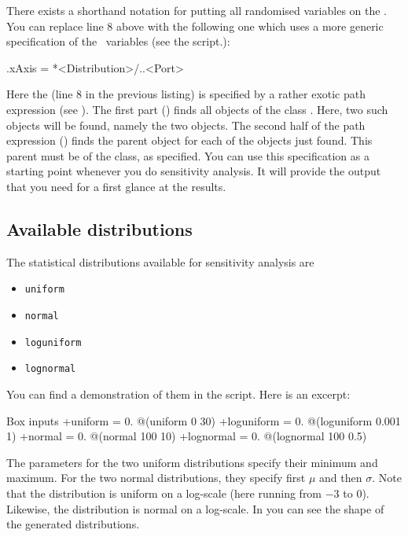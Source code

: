 There exists a shorthand notation for putting all randomised variables on the \xaxis. You can replace line 8 above with the following one which uses a more generic specification of the \xaxis\ variables (see the  script.):
\begin{boxscript}
.xAxis = *<Distribution>/..<Port>
\end{boxscript}

Here the  (line 8 in the previous listing) is specified by a rather exotic path expression (see ). The first part () finds all objects of the class . Here, two such objects will be found, namely the two  objects. The second half of the path expression () finds the parent object for each of the  objects just found. This parent must be of the  class, as specified. You can use this  specification as a starting point whenever you do sensitivity analysis. It will provide the output that you need for a first glance at the results.

\subsection{Available distributions}
\label{ch:sensitivity-analysis-distributions}
The statistical distributions available for sensitivity analysis are
\begin{itemize}
\item{\texttt{uniform}}
\item{\texttt{normal}}
\item{\texttt{loguniform}}
\item{\texttt{lognormal}}
\end{itemize}

You can find a demonstration of them in the  script. Here is an excerpt:
\lstset{numbers=left}
\begin{boxscript}
Box inputs {
	+uniform = 0. @(uniform 0 30)
	+loguniform = 0. @(loguniform 0.001 1)
	+normal = 0. @(normal 100 10)
	+lognormal = 0. @(lognormal 100 0.5)
}
\end{boxscript}
\lstset{numbers=none}

The parameters for the two uniform distributions specify their minimum and maximum. For the two normal distributions, they specify first $\mu$ and then $\sigma$. Note that the  distribution is uniform on a log-scale (here running from $-3$ to 0). Likewise, the  distribution is normal on a log-scale. In  you can see the shape of the generated distributions. 


